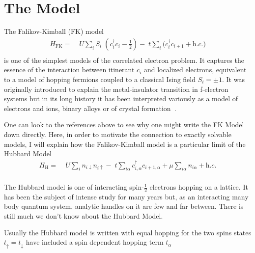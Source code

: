 \hypertarget{the-model}{%
\section{The Model}\label{the-model}}

The Falikov-Kimball (FK) model \[\begin{aligned}
H_{\mathrm{FK}} = & \;U \sum_{i} S_i\;(c^\dagger_{i}c_{i} - \tfrac{1}{2}) -\;t \sum_{i} (c^\dagger_{i}c_{i+1} + \textit{h.c.)}\\ 
\end{aligned}\] is one of the simplest models of the correlated electron problem. It captures the essence of the interaction between itinerant \(c_i\) and localized electrons, equivalent to a model of hopping fermions coupled to a classical Ising field \(S_i = \pm 1\). It was originally introduced to explain the metal-insulator transition in f-electron systems but in its long history it has been interpreted variously as a model of electrons and ions, binary alloys or of crystal formation~\autocite{hubbardj.ElectronCorrelationsNarrow1963,falicovSimpleModelSemiconductorMetal1969,gruberFalicovKimballModelReview1996,gruberFalicovKimballModel2006}.

One can look to the references above to see why one might write the FK Model down directly. Here, in order to motivate the connection to exactly solvable models, I will explain how the Falikov-Kimball model is a particular limit of the Hubbard Model \[\begin{aligned}
H_{\mathrm{H}} = & \;U \sum_{i} n_{i\downarrow} n_{i\uparrow} -\;t \sum_{i\alpha} c^\dagger_{i,\alpha}c_{i+1,\alpha} + \mu \sum_{i\alpha} n_{i\alpha} + \textit{h.c.} \\ 
\end{aligned}\]

The Hubbard model is one of interacting spin-\(\tfrac{1}{2}\) electrons hopping on a lattice. It has been the subject of intense study for many years but, as an interacting many body quantum system, analytic handles on it are few and far between. There is still much we don't know about the Hubbard Model.

Usually the Hubbard model is written with equal hopping for the two spins states \(t_\uparrow = t_\downarrow\) have included a spin dependent hopping term \(t_\alpha\)

\begin{Shaded}
\begin{Highlighting}[]

\end{Highlighting}
\end{Shaded}

